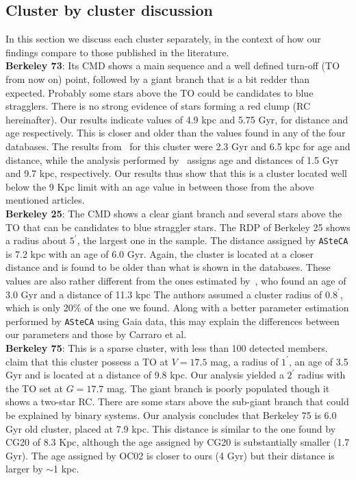 \documentclass[draft]{aa}
\begin{document}
 \subsection{Cluster by cluster discussion}
  \label{ssec:indiv_clusters}

  In this section we discuss each cluster separately, in the context of how our
  findings compare to those published in the literature.\\

  \noindent \textbf{Berkeley 73}: Its CMD shows a main sequence and a well
  defined turn-off (TO from now on) point, followed by a giant branch that is a
  bit redder than expected. Probably some stars above the TO could be candidates
  to blue stragglers. There is no strong evidence of stars forming a red clump 
  (RC hereinafter).
  Our results indicate values of 4.9 kpc and 5.75 Gyr, for distance and age
  respectively. This is closer and older than the values found in any of the
  four databases.
  The results from~\cite{Ortolani_2005} for this cluster were 2.3
  Gyr and 6.5 kpc for age and distance, while the analysis performed
  by~\cite{Carraro_2005} assigns age and distances of 1.5 Gyr and 9.7 kpc,
  respectively. Our results thus show that this is a cluster located well below
  the 9 Kpc limit with an age value in between those from the above mentioned
  articles.\\

  \textbf{Berkeley 25}: The CMD shows a clear giant branch and several stars
  above the TO that can be candidates to blue straggler stars. The RDP of
  Berkeley 25 shows a radius about $5^{\prime}$, the largest one in the sample.
  The distance assigned by \texttt{ASteCA} is 7.2 kpc with an age of 6.0 Gyr.
  Again, the cluster is located at a closer distance and is found to be older
  than what is shown in the databases.
  These values are also rather different from the ones estimated
  by~\cite{Carraro_2005}, who found an age of 3.0 Gyr and a distance of 11.3 kpc
  The authors assumed a cluster radius of $0.8^{\prime}$, which is only 20\% of
  the one we found. Along with a better parameter estimation performed by 
  \texttt{ASteCA} using Gaia data, this may explain the differences between
  our parameters and those by Carraro et al.\\

  \textbf{Berkeley 75}: This is a sparse cluster, with less than 100 detected
  members. \cite{Carraro_2005} claim that this cluster possess
  a TO at $V= 17.5$ mag, a radius of $1^{\prime}$, an age of 3.5 Gyr and is
  located at a distance of 9.8 kpc.
  Our analysis yielded a $2^{\prime}$ radius with the TO set at $G=17.7$ mag.
  The giant branch is poorly populated though it shows a two-star RC.
  There are some stars above the sub-giant branch that could be explained
  by binary systems. Our analysis concludes that Berkeley 75 is 6.0 Gyr old
  cluster, placed at 7.9 kpc. This distance is similar to the one found by CG20
  of 8.3 Kpc, although the age assigned by CG20 is substantially smaller (1.7
  Gyr). The age assigned by OC02 is closer to ours (4 Gyr) but their distance is
  larger by $\sim$1 kpc.\\
\end{document}

